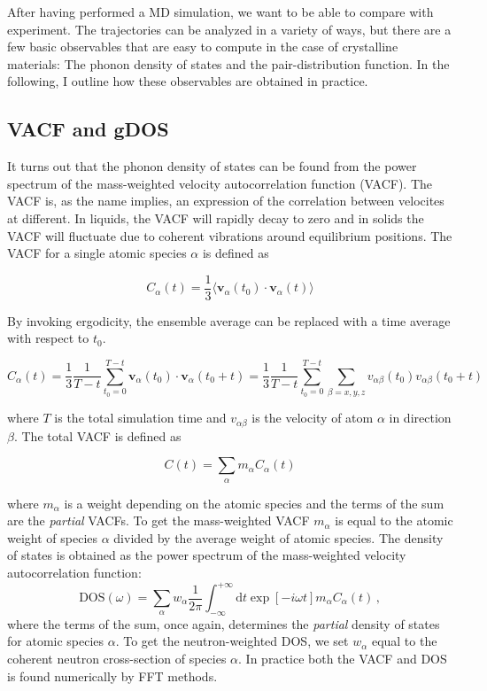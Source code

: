After having performed a MD simulation, we want to be able to compare with experiment. The trajectories can be analyzed in a variety of ways, but there are a few basic observables that are easy to compute in the case of crystalline materials: The phonon density of states and the pair-distribution function.  In the following, I outline how these observables are obtained in practice.

\subsection{VACF and gDOS}
It turns out \cite{Dove1993} that the phonon density of states can be found from the power spectrum of the mass-weighted velocity autocorrelation function (VACF). The VACF is, as the name implies, an expression of the correlation between velocites at different. In liquids, the VACF will rapidly decay to zero and in solids the VACF will fluctuate due to coherent vibrations around equilibrium positions. The VACF for a single atomic species $\alpha$ is defined as

\[ C_\alpha(t) = \frac{1}{3} \langle \bm{v}_\alpha(t_0) \cdot \bm{v}_\alpha(t) \rangle \]

\noindent By invoking ergodicity, the ensemble average can be replaced with a time average with respect to $t_0$.

\[ C_\alpha(t) = \frac{1}{3} \frac{1}{T-t} \sum_{t_0=0}^{T-t} \bm{v}_\alpha(t_0) \cdot \bm{v}_\alpha(t_0 + t) = \frac{1}{3} \frac{1}{T-t} \sum_{t_0=0}^{T-t} \sum_{\beta=x,y,z} v_{\alpha\beta}(t_0) v_{\alpha\beta}(t_0 + t) \]

\noindent where $T$ is the total simulation time and $v_{\alpha\beta}$ is the velocity of atom $\alpha$ in direction $\beta$. The total VACF is defined as

\[ C(t) = \sum_\alpha m_\alpha C_\alpha(t) \]

\noindent where $m_\alpha$ is a weight depending on the atomic species and the terms of the sum are the \emph{partial} VACFs. To get the mass-weighted VACF $m_\alpha$ is equal to the atomic weight of species $\alpha$ divided by the average weight of atomic species. The density of states is obtained as the power spectrum of the mass-weighted velocity autocorrelation function:
%
\[ \text{DOS}(\omega) = \sum_\alpha w_\alpha \frac{1}{2\pi} \int^{+\infty}_{-\infty} \mathrm{d}t \exp[-i\omega t] m_\alpha C_\alpha(t) \, , \]
%
where the terms of the sum, once again, determines the \emph{partial} density of states for atomic species $\alpha$. To get the neutron-weighted DOS, we set $w_\alpha$ equal to the coherent neutron cross-section of species $\alpha$. In practice both the VACF and DOS is found numerically by FFT methods.

